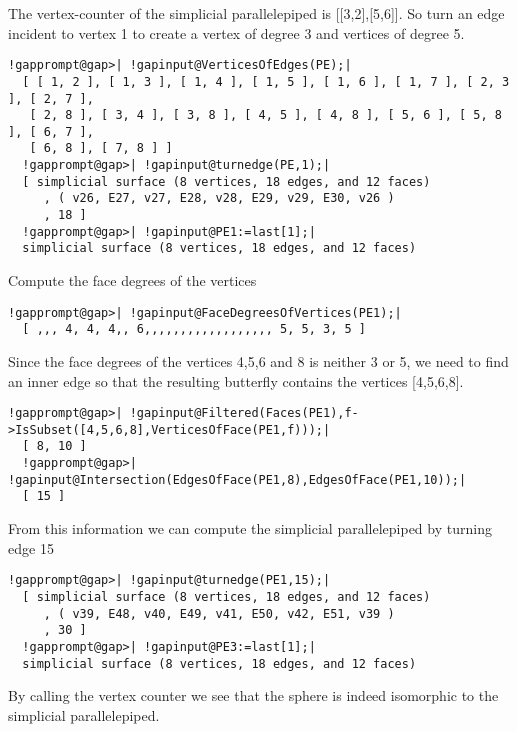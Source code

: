 \documentclass[a4paper,11pt]{report}
\begin{document}
{{{ The vertex-counter of the simplicial parallelepiped is [[3,2],[5,6]]. So turn
an edge incident to vertex 1 to create a vertex of degree 3 and vertices of
degree 5. 
\begin{Verbatim}[commandchars=!@|,fontsize=\small,frame=single,label=Example]
  !gapprompt@gap>| !gapinput@VerticesOfEdges(PE);|
  [ [ 1, 2 ], [ 1, 3 ], [ 1, 4 ], [ 1, 5 ], [ 1, 6 ], [ 1, 7 ], [ 2, 3 ], [ 2, 7 ], 
   [ 2, 8 ], [ 3, 4 ], [ 3, 8 ], [ 4, 5 ], [ 4, 8 ], [ 5, 6 ], [ 5, 8 ], [ 6, 7 ], 
   [ 6, 8 ], [ 7, 8 ] ]
  !gapprompt@gap>| !gapinput@turnedge(PE,1);|
  [ simplicial surface (8 vertices, 18 edges, and 12 faces)
     , ( v26, E27, v27, E28, v28, E29, v29, E30, v26 )
     , 18 ]
  !gapprompt@gap>| !gapinput@PE1:=last[1];|
  simplicial surface (8 vertices, 18 edges, and 12 faces)
\end{Verbatim}
 

 Compute the face degrees of the vertices 
\begin{Verbatim}[commandchars=!@|,fontsize=\small,frame=single,label=Example]
  !gapprompt@gap>| !gapinput@FaceDegreesOfVertices(PE1);|
  [ ,,, 4, 4, 4,, 6,,,,,,,,,,,,,,,,,, 5, 5, 3, 5 ]
\end{Verbatim}
 

 Since the face degrees of the vertices 4,5,6 and 8 is neither 3 or 5, we need
to find an inner edge so that the resulting butterfly contains the vertices
[4,5,6,8]. 

 
\begin{Verbatim}[commandchars=!@|,fontsize=\small,frame=single,label=Example]
  !gapprompt@gap>| !gapinput@Filtered(Faces(PE1),f->IsSubset([4,5,6,8],VerticesOfFace(PE1,f)));|
  [ 8, 10 ]
  !gapprompt@gap>| !gapinput@Intersection(EdgesOfFace(PE1,8),EdgesOfFace(PE1,10));|
  [ 15 ]
\end{Verbatim}
 

 From this information we can compute the simplicial parallelepiped by turning
edge 15 

 
\begin{Verbatim}[commandchars=!@|,fontsize=\small,frame=single,label=Example]
  !gapprompt@gap>| !gapinput@turnedge(PE1,15);|
  [ simplicial surface (8 vertices, 18 edges, and 12 faces)
     , ( v39, E48, v40, E49, v41, E50, v42, E51, v39 )
     , 30 ]
  !gapprompt@gap>| !gapinput@PE3:=last[1];|
  simplicial surface (8 vertices, 18 edges, and 12 faces)
\end{Verbatim}
 

 By calling the vertex counter we see that the sphere is indeed isomorphic to
the simplicial parallelepiped. 

}}}
\end{document}
